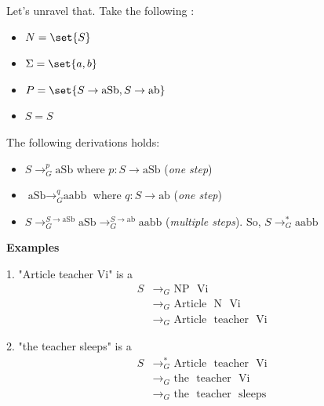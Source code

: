 Let's unravel that. Take the following :
\begin{itemize}
    \item $N = \set{S}$
    \item $\Sigma = \set{a,b}$
    \item $P = \set{S \to \text{aSb}, S \to \text{ab}}$
    \item $S = S$
\end{itemize}
The following derivations holds:
\begin{itemize}
    \item $S \to_{G}^{p} \text{aSb}$ where $p: S \to \text{aSb}$ (\textit{one step})
    \item $\text{aSb} \to_{G}^{q} \text{aabb}$ where $q: S \to \text{ab}$ (\textit{one step})
    \item $S \to_{G}^{S \to \text{aSb}} \text{aSb} \to_{G}^{S \to \text{ab}} \text{aabb}$ (\textit{multiple steps}). So, $S \to_{G}^{*} \text{aabb}$
\end{itemize}




\textbf{Examples}

1. "Article teacher Vi" is a 
\begin{align*}
S &{\to_G} \text{ NP } \text{ Vi } \\
&{\to_G} \text{ Article } \text{ N } \text{ Vi } \\
&{\to_G} \text{ Article } \text{ teacher } \text{ Vi }
\end{align*}

2. "the teacher sleeps" is a 
\begin{align*}
S &{\to_G^{*}} \text{ Article } \text{ teacher } \text{ Vi } \\
&{\to_G} \text{ the } \text{ teacher } \text{ Vi } \\
&{\to_G} \text{ the } \text{ teacher } \text{ sleeps }
\end{align*}


